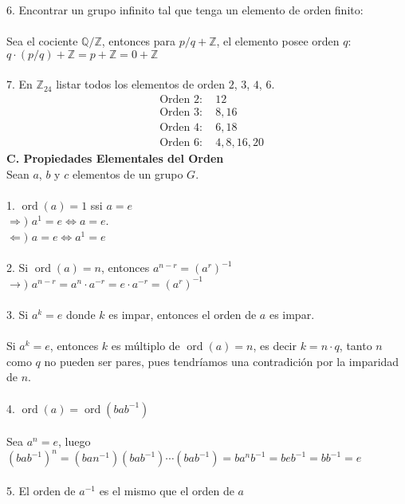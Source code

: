 \documentclass{article}
\begin{document}
6. Encontrar un grupo infinito tal que tenga un elemento de orden finito:
\\
\\
Sea el cociente $\mathbb{Q}/\mathbb{Z}$, entonces para $p/q + \mathbb{Z}$, el elemento posee orden $q$: $q \cdot (p/q)+\mathbb{Z} = p + \mathbb{Z} = 0+\mathbb{Z}$
\\
\\
7. En $\mathbb{Z}_{24}$ listar todos los elementos de orden $2$, $3$, $4$, $6$.
\begin{equation*}
\begin{aligned}
    &\text{Orden } 2: \quad 12 \\
    &\text{Orden } 3: \quad 8,16 \\
    &\text{Orden } 4: \quad 6,18 \\
    &\text{Orden } 6: \quad 4,8,16,20
\end{aligned}
\end{equation*}
\textbf{C. Propiedades Elementales del Orden}
\\
Sean $a$, $b$ y $c$ elementos de un grupo $G$.
\\
\\
1. $\operatorname{ord}(a)=1$ ssi $a=e$
\\
$\Longrightarrow)$ $a^{1}=e \Longleftrightarrow a = e$.
\\
$\Longleftarrow)$ $a=e \Longleftrightarrow a^{1}=e$
\\
\\
2. Si $\operatorname{ord}(a)=n$, entonces $a^{n-r}=(a^{r})^{-1}$
\\
$\longrightarrow)$ $a^{n-r}=a^{n} \cdot a^{-r}= e \cdot a^{-r}= (a^{r})^{-1}$
\\
\\
3. Si $a^{k}=e$ donde $k$ es impar, entonces el orden de $a$ es impar.
\\
\\
Si $a^{k}=e$, entonces $k$ es múltiplo de $\operatorname{ord}(a)=n$, es decir $k=n \cdot q$, tanto $n$ como $q$ no pueden ser pares, pues tendríamos una contradición por la imparidad de $n$.
\\
\\
4. $\operatorname{ord}(a)=\operatorname{ord}(bab^{-1})$
\\
\\
Sea $a^{n}=e$, luego $(bab^{-1})^{n}=(ban^{-1})(bab^{-1}) \cdots (bab^{-1})=ba^{n}b^{-1}=beb^{-1}=bb^{-1}=e$
\\
\\
5. El orden de $a^{-1}$ es el mismo que el orden de $a$
\end{document}
